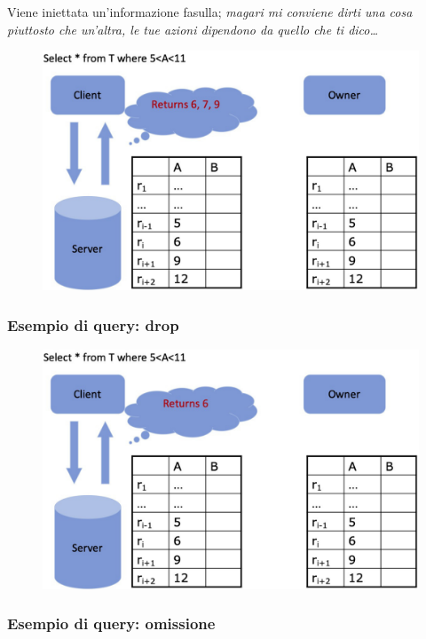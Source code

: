 \documentclass{report}
\begin{document}
Viene iniettata un'informazione fasulla; \textit{magari mi 
conviene dirti una cosa piuttosto che un'altra, le tue azioni dipendono 
da quello che ti dico\dots}

\begin{figure}[H]
    \centering
    \includegraphics[width=0.9\linewidth]{images/ex2.png}
\end{figure}


\subsubsection{Esempio di query: drop}

\begin{figure}[H]
    \centering
    \includegraphics[width=0.9\linewidth]{images/ex3.png}
\end{figure}


\newpage
\subsubsection{Esempio di query: omissione}
\end{document}
